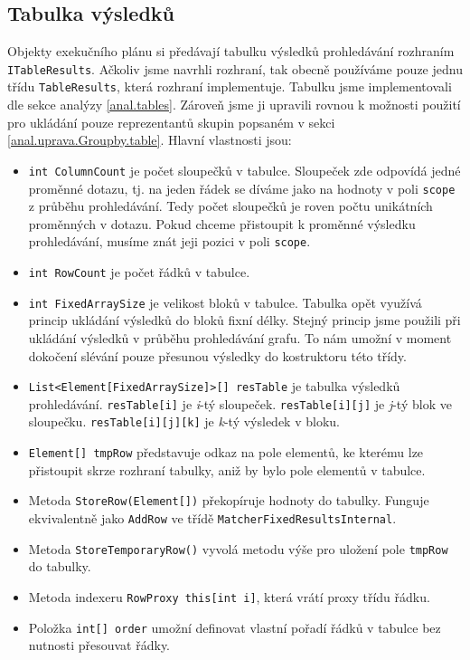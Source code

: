 \subsection{Tabulka výsledků}

Objekty exekučního plánu si předávají tabulku výsledků prohledávání rozhraním \texttt{ITableResults}.
Ačkoliv jsme navrhli rozhraní, tak obecně používáme pouze jednu třídu \texttt{TableResults}, která rozhraní implementuje.
Tabulku jsme implementovali dle sekce analýzy \ref{anal.tables}.
Zároveň jsme ji upravili rovnou k možnosti použití pro ukládání pouze reprezentantů skupin popsaném v sekci \ref{anal.uprava.Groupby.table}.
Hlavní vlastnosti jsou:
\begin{itemize}
\item \texttt{int ColumnCount} je počet sloupečků v tabulce.
Sloupeček zde odpovídá jedné proměnné dotazu, tj. na jeden řádek se díváme jako na hodnoty v poli \texttt{scope} z průběhu prohledávání.
Tedy počet sloupečků je roven počtu unikátních proměnných v dotazu.
Pokud chceme přistoupit k proměnné výsledku prohledávání, musíme znát jeji pozici v poli \texttt{scope}.

\item \texttt{int RowCount} je počet řádků v tabulce.
\item \texttt{int FixedArraySize} je velikost bloků v tabulce.
Tabulka opět využívá princip ukládání výsledků do bloků fixní délky.
Stejný princip jsme použili při ukládání výsledků v průběhu prohledávání grafu.
To nám umožní v moment dokočení slévání pouze přesunou výsledky do kostruktoru této třídy.
\item \texttt{List<Element[FixedArraySize]>[] resTable} je tabulka výsledků prohledávání.
\texttt{resTable[i]} je \textit{i}-tý sloupeček.
\texttt{resTable[i][j]} je \textit{j}-tý blok ve sloupečku.
\texttt{resTable[i][j][k]} je \textit{k}-tý výsledek v bloku.
\item \texttt{Element[] tmpRow} představuje odkaz na pole elementů, ke kterému lze přistoupit skrze rozhraní tabulky, aniž by bylo pole elementů v tabulce.
\item Metoda \texttt{StoreRow(Element[])} překopíruje hodnoty do tabulky. Funguje ekvivalentně jako \texttt{AddRow} ve třídě \texttt{MatcherFixedResultsInternal}.
\item Metoda \texttt{StoreTemporaryRow()} vyvolá metodu výše pro uložení pole \texttt{tmpRow} do tabulky.
\item Metoda indexeru \texttt{RowProxy this[int i]}, která vrátí proxy třídu řádku.
\item Položka \texttt{int[] order} umožní definovat vlastní pořadí řádků v tabulce bez nutnosti přesouvat řádky.

\end{itemize}
